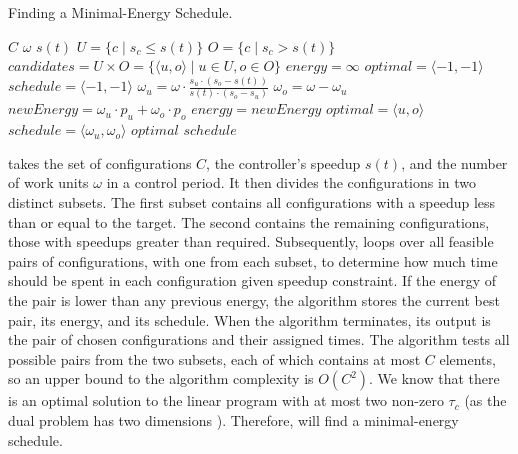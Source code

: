 \begin{algorithm}[t]
  \caption{Finding a Minimal-Energy Schedule.}
  \begin{algorithmic}
    \footnotesize
    \Require $C$ 
    \Require $\omega$ 
    \Require $s(t)$ 
    \State $U = \{c \mid s_c \le s(t) \}$
    \State $O = \{c \mid s_c > s(t)\}$
    \State $candidates = U \times O = \{\langle u, o \rangle \mid u \in U, o \in O\}$
    \State $energy = \infty$
    \State $optimal = \langle -1, -1 \rangle$
    \State $schedule = \langle -1, -1 \rangle$ \newline
     
    \State $\omega_u = \omega \cdot \frac{s_u \cdot (s_o - s(t))}{s(t) \cdot (s_o - s_u)}$ 
    \State $\omega_o = \omega - \omega_u$
    \State $newEnergy = \omega_u \cdot p_u + \omega_o \cdot p_o$ 
     
    \State $energy = newEnergy$
    \State $optimal = \langle u, o \rangle$
    \State $schedule = \langle \omega_u,\omega_o \rangle$
    \EndIf
    \EndFor \newline \newline
    \Return $optimal$  \newline
    \Return $schedule$ 
  \end{algorithmic}
  \label{algo:poet-optimal}
\end{algorithm}

 takes the set of configurations $C$, the controller's speedup $s(t)$, and the number of work units $\omega$ in a control period.
It then divides the configurations in two distinct subsets.
The first subset contains all configurations with a speedup less than or equal to the target.
The second contains the remaining configurations, \ie those with speedups greater than required.
Subsequently,  loops over all feasible pairs of configurations, with one from each subset, to determine how much time should be spent in each configuration given speedup constraint.
If the energy of the pair is lower than any previous energy, the algorithm stores the current best pair, its energy, and its schedule.
When the algorithm terminates, its output is the pair of chosen configurations and their assigned times.
The algorithm tests all possible pairs from the two subsets, each of which contains at most $C$ elements, so an upper bound to the algorithm complexity is $O(C^2)$.
We know that there is an optimal solution to the linear program with at most two non-zero $\tau_c$ (as the dual problem has two dimensions \cite{LP}).
Therefore,  will find a minimal-energy schedule.


